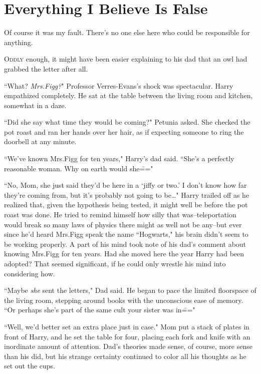 \chapter{Everything I Believe Is False}

\begin{chapterOpeningQuote}
Of course it was my fault. There's no one else here who could be responsible for anything.
\end{chapterOpeningQuote}

\lettrine{O}{ddly} enough, it might have been easier explaining to his dad that an owl had grabbed the letter after all.

``What? \emph{Mrs.\?Figg?}" Professor Verres-Evans's shock was spectacular. Harry empathized completely. He sat at the table between the living room and kitchen, somewhat in a daze.

``Did she say what time they would be coming?" Petunia asked. She checked the pot roast and ran her hands over her hair, as if expecting someone to ring the doorbell at any minute.

``We've known Mrs.\?Figg for ten years," Harry's dad said. ``She's a perfectly reasonable woman. Why on earth would she\==="

``No, Mom, she just said they'd be here in a `jiffy or two.' I don't know how far they're coming from, but it's probably not going to be{\ldots}" Harry trailed off as he realized that, given the hypothesis being tested, it might well be before the pot roast was done. He tried to remind himself how silly that was\---teleportation would break so many laws of physics there might as well not be any\---but ever since he'd heard Mrs.\?Figg speak the name ``Hogwarts," his brain didn't seem to be working properly. A part of his mind took note of his dad's comment about knowing Mrs.\?Figg for ten years. Had she moved here the year Harry had been adopted? That seemed significant, if he could only wrestle his mind into considering how.

``Maybe \emph{she} sent the letters," Dad said. He began to pace the limited floorspace of the living room, stepping around books with the unconscious ease of memory. ``Or perhaps she's part of the same cult your sister was in\==="

``Well, we'd better set an extra place just in case." Mom put a stack of plates in front of Harry, and he set the table for four, placing each fork and knife with an inordinate amount of attention. Dad's theories made sense, of course, more sense than his did, but his strange certainty continued to color all his thoughts as he set out the cups.

